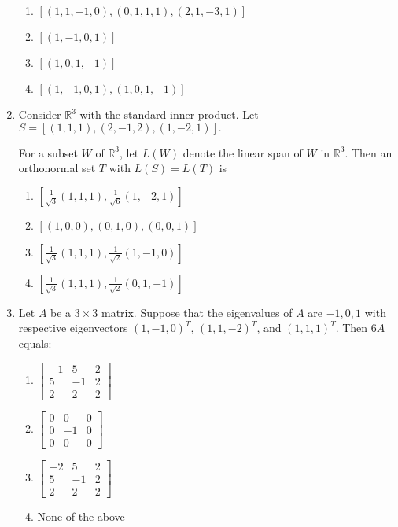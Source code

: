 \documentclass[journal]{IEEEtran}
\newcommand{\brak}[1]{\left( #1 \right)}
\newcommand{\sbrak}[1]{\left[ #1 \right]}
\begin{document}
\begin{enumerate}
    \begin{enumerate}
        \item $\sbrak{\brak{1, 1, -1, 0}, \brak{0, 1, 1, 1}, \brak{2, 1, -3, 1}}$
        \item $\sbrak{\brak{1, -1, 0, 1}}$
        \item $\sbrak{\brak{1, 0, 1, -1}}$
        \item $\sbrak{\brak{1, -1, 0, 1}, \brak{1, 0, 1, -1}}$
    \end{enumerate}
    

   \item Consider $\mathbb{R}^3$ with the standard inner product. Let
   $S=\sbrak{\brak{1,1,1}, \brak{2,-1,2}, \brak{1,-2,1}}.$

    For a subset $W$ of $\mathbb{R}^3$, let $L\brak{W}$ denote the linear span of $W$ in $\mathbb{R}^3$. Then an orthonormal set $T$ with $L\brak{S}=L\brak{T}$ is 
  
    \begin{enumerate}
      \item $\sbrak{\frac{1}{\sqrt{3}}\brak{1,1,1}, \frac{1}{\sqrt{6}}\brak{1,-2,1}}$
      \item $\sbrak{\brak{1,0,0}, \brak{0,1,0}, \brak{0,0,1}}$
      \item $\sbrak{\frac{1}{\sqrt{3}}\brak{1,1,1}, \frac{1}{\sqrt{2}}\brak{1,-1,0}}$
      \item $\sbrak{\frac{1}{\sqrt{3}}\brak{1,1,1}, \frac{1}{\sqrt{2}}\brak{0,1,-1}}$
    \end{enumerate}

  \item Let $A$ be a $3\times3$ matrix. Suppose that the eigenvalues of $A$ are $-1,0,1$ with respective
eigenvectors $\brak{1,-1,0}^T$, $\brak{1,1,-2}^T$, and $\brak{1,1,1}^T$. Then $6A$ equals:

    \begin{enumerate}
      \item $\begin{bmatrix}
        -1 & 5 & 2 \\
        5 & -1 & 2 \\
        2 & 2 & 2
      \end{bmatrix}$
      \item $\begin{bmatrix}
        0 & 0 & 0 \\
        0 & -1 & 0 \\
        0 & 0 & 0
      \end{bmatrix}$
      \item $\begin{bmatrix}
        -2 & 5 & 2 \\
        5 & -1 & 2 \\
        2 & 2 & 2
      \end{bmatrix}$
      \item None of the above
    \end{enumerate}


\end{enumerate}
\end{document}
